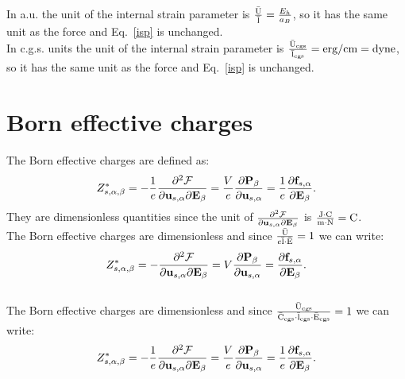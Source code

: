 \documentclass[12pt,a4paper,twoside]{report}
\begin{document}
{\color{web-blue} In a.u. the unit of the internal strain parameter is
${{\rm \bar U} \over {\rm \bar l}}={E_h \over a_B}$, so it has the same unit as the force
and Eq.~\ref{isp} is unchanged.
}
\\

{\color{orange} In c.g.s. units the unit of the internal strain parameter is
${{\rm \bar U_{cgs}} \over {\rm \bar l_{cgs}}}={\rm erg}/{\rm cm}={\rm dyne}$, so it has the same unit 
as the force and Eq.~\ref{isp} is unchanged.
}

\newpage
{\color{coral}\section{Born effective charges}}
\color{black}

The Born effective charges are defined as:
\begin{equation}
Z^*_{s,\alpha,\beta}=-{1\over e} {\partial^2 \mathcal{F} \over \partial 
{\bf u}_{s,\alpha} \partial {\bf E}_{\beta}}={V\over e} {
\partial {\bf P}_{\beta} \over \partial 
{\bf u}_{s,\alpha}}={1\over e} {\partial {\bf f}_{s,\alpha} 
\over \partial {\bf E}_{\beta}}.
\end{equation}
They are dimensionless quantities since the unit of 
${\partial^2 \mathcal{F} \over \partial 
{\bf u}_{s,\alpha} \partial {\bf E}_{\beta}}$ is ${{\rm J} \cdot {\rm C} \over {\rm m}\cdot {\rm N}}=
{\rm C}$.
\\

{\color{web-blue} The Born effective charges are dimensionless 
and since 
${{\rm \bar U} \over e {\rm \bar l}\cdot {\rm \bar E}}=1$ we can write:
\begin{equation}
Z^*_{s,\alpha,\beta}=-{\partial^2 \mathcal{F} \over \partial 
{\bf u}_{s,\alpha} \partial {\bf E}_{\beta}} 
=V {
\partial {\bf P}_{\beta} \over \partial 
{\bf u}_{s,\alpha}}={\partial {\bf f}_{s,\alpha} 
\over \partial {\bf E}_{\beta}}.
\end{equation}
}
\\

{\color{orange} The Born effective charges are dimensionless
and since 
${{\rm \bar U_{cgs}} \over {\rm \bar C_{cgs}}\cdot {\rm \bar l_{cgs}}
\cdot {\rm \bar E_{cgs}}}=1$ we can write:
\begin{equation}
Z^*_{s,\alpha,\beta}=-{1\over e}{\partial^2 \mathcal{F} \over \partial 
{\bf u}_{s,\alpha} \partial {\bf E}_{\beta}}={V\over e} {
\partial {\bf P}_{\beta} \over \partial 
{\bf u}_{s,\alpha}}={1\over e} {\partial {\bf f}_{s,\alpha} 
\over \partial {\bf E}_{\beta}}.
\end{equation}
}
\end{document}
